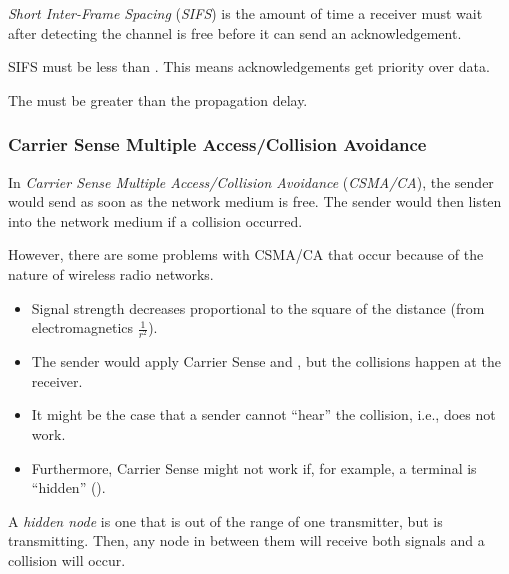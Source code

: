 \begin{definition}\label{def:SIFS}
  \emph{Short Inter-Frame Spacing} (\emph{SIFS}) is the amount of time a receiver must wait after detecting the channel is free before it can send an acknowledgement.

  SIFS must be less than .
  This means acknowledgements get priority over data.

  \begin{remark}
    The  must be greater than the propagation delay.
  \end{remark}
\end{definition}

\subsubsection{Carrier Sense Multiple Access/Collision Avoidance}\label{subsubsec:CSMACA}
\begin{definition}\label{def:CSMACA}
  In \emph{Carrier Sense Multiple Access/Collision Avoidance} (\emph{CSMA/CA}), the sender would send as soon as the network medium is free.
  The sender would then listen into the network medium if a collision occurred.

  However, there are some problems with CSMA/CA that occur because of the nature of wireless radio networks.
  \begin{itemize}[noitemsep]
  \item Signal strength decreases proportional to the square of the distance (from electromagnetics $\frac{1}{r^{2}}$).
  \item The sender would apply Carrier Sense and , but the collisions happen at the receiver.
  \item It might be the case that a sender cannot “hear” the collision, i.e.,  does not work.
  \item Furthermore, Carrier Sense might not work if, for example, a terminal is “hidden” ().
  \end{itemize}
\end{definition}

\begin{definition}\label{def:Hidden_Node}
  A \emph{hidden node} is one that is out of the range of one transmitter, but is transmitting.
  Then, any node in between them will receive both signals and a collision will occur.
\end{definition}

